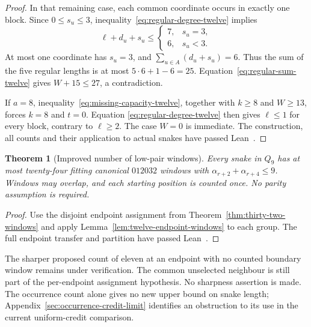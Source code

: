 \documentclass[11pt,a4paper]{article}
\newtheorem{theorem}{Theorem}[section]
\theoremstyle{definition}
\theoremstyle{remark}
\newcommand{\Q}{Q}
\begin{document}
\begin{proof}
In that remaining case, each common coordinate occurs in exactly one block.
Since $0\le s_u\le3$, inequality~\eqref{eq:regular-degree-twelve} implies
\[
\ell+d_u+s_u\le
\begin{cases}7,&s_u=3,\\6,&s_u<3.\end{cases}
\]
At most one coordinate has $s_u=3$, and $\sum_{u\in A}(d_u+s_u)=6$.
Thus the sum of the five regular lengths is at most $5\cdot6+1-6=25$.
Equation~\eqref{eq:regular-sum-twelve} gives $W+15\le27$, a contradiction.

If $a=8$, inequality~\eqref{eq:missing-capacity-twelve}, together with
$k\ge8$ and $W\ge13$, forces $k=8$ and $t=0$. Equation
\eqref{eq:regular-degree-twelve} then gives $\ell\le1$ for every block,
contrary to $\ell\ge2$. The case $W=0$ is immediate. The construction,
all counts and their application to actual snakes have passed Lean~\cite{count24archive}.
\end{proof}

\begin{theorem}[Improved number of low-pair windows]\label{thm:twenty-four-windows}
Every snake in $\Q_9$ has at most twenty-four fitting canonical $012032$
windows with $\alpha_{r+2}+\alpha_{r+4}\le9$. Windows may overlap, and
each starting position is counted once. No parity assumption is required.
\end{theorem}
\begin{proof}
Use the disjoint endpoint assignment from Theorem~\ref{thm:thirty-two-windows}
and apply Lemma~\ref{lem:twelve-endpoint-windows} to each group.
The full endpoint transfer and partition have passed Lean~\cite{count24archive}.
\end{proof}

The sharper proposed count of eleven at an endpoint with no counted boundary
window remains under verification. The common unselected neighbour is still
part of the per-endpoint assignment hypothesis. No sharpness assertion is made.
The occurrence count alone gives no new upper bound on snake length;
Appendix~\ref{sec:occurrence-credit-limit} identifies an obstruction to its
use in the current uniform-credit comparison.
\end{document}
